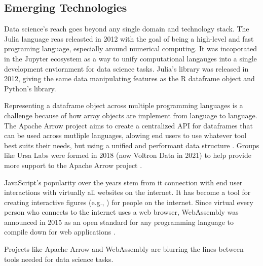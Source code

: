 \documentclass[010-intro.tex]{subfiles}
\begin{document}
\subsection{Emerging Technologies}

Data science's reach goes beyond any single domain and technology stack.
The Julia language reas releasted in 2012 with the goal of being a high-level and fast programing language,
especially around numerical computing.
It was incoporated in the Jupyter ecosystem as a way to unify computational langauges into a single
development enviornment for data science tasks.
Julia's  library was released in 2012, giving the same data manipulating
features as the R dataframe object and Python's  library.

Representing a dataframe object across multiple programming languages is a challenge because of
how array objects are implement from language to language.
The Apache Arrow project aims to create a centralized API for dataframes that can be used across mutliple languages,
alowing end users to use whatever tool best suits their needs,
but using a unified and performant data structure
\cite{ApacheArrow}.
Groups like Ursa Labs were formed in 2018 (now Voltron Data in 2021) to help provide
more support to the Apache Arrow project
\cite{UrsaLabs, VoltronData}.

JavaScript's popularity over the years stem from it connection with end user interactions with
virtually all websites on the internet.
It has become a tool for creating interactive figures (e.g., ) for people on the internet.
Since virtual every person who connects to the internet uses a web browser,
WebAssembly was announced in 2015 as an open standard for any programming language
to compile down for web applications
\cite{WebAssembly}.

Projects like Apache Arrow and WebAssembly are blurring the lines between tools needed for data science tasks.
\end{document}
